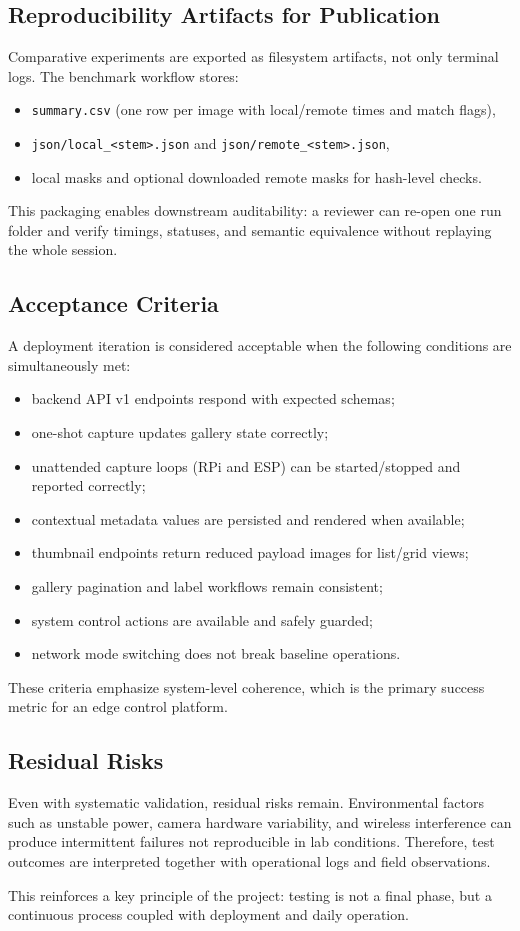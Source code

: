\subsection{Reproducibility Artifacts for Publication}
Comparative experiments are exported as filesystem artifacts, not only terminal logs. The benchmark workflow stores:
\begin{itemize}
  \item \texttt{summary.csv} (one row per image with local/remote times and match flags),
  \item \texttt{json/local\_<stem>.json} and \texttt{json/remote\_<stem>.json},
  \item local masks and optional downloaded remote masks for hash-level checks.
\end{itemize}

This packaging enables downstream auditability: a reviewer can re-open one run folder and verify timings, statuses, and semantic equivalence without replaying the whole session.

\subsection{Acceptance Criteria}
A deployment iteration is considered acceptable when the following conditions are simultaneously met:
\begin{itemize}
  \item backend API v1 endpoints respond with expected schemas;
  \item one-shot capture updates gallery state correctly;
  \item unattended capture loops (RPi and ESP) can be started/stopped and reported correctly;
  \item contextual metadata values are persisted and rendered when available;
  \item thumbnail endpoints return reduced payload images for list/grid views;
  \item gallery pagination and label workflows remain consistent;
  \item system control actions are available and safely guarded;
  \item network mode switching does not break baseline operations.
\end{itemize}

These criteria emphasize system-level coherence, which is the primary success metric for an edge control platform.

\subsection{Residual Risks}
Even with systematic validation, residual risks remain. Environmental factors such as unstable power, camera hardware variability, and wireless interference can produce intermittent failures not reproducible in lab conditions. Therefore, test outcomes are interpreted together with operational logs and field observations.

This reinforces a key principle of the project: testing is not a final phase, but a continuous process coupled with deployment and daily operation.
